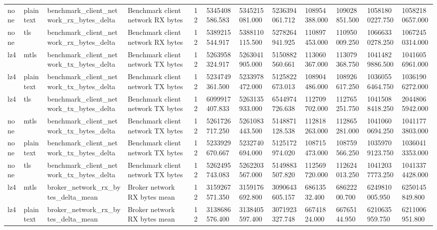 \begin{longtable}{llllllllllll}
none & plaintext & benchmark\_client\_network\_rx\_bytes\_delta & Benchmark client network RX bytes & 12 & 5345408586.583 & 5345215081.000 & 5236394061.712 & 108954388.000 & 109028851.500 & 10581800227.750 & 10582180657.000 \\
none & tls & benchmark\_client\_network\_rx\_bytes\_delta & Benchmark client network RX bytes & 12 & 5389215544.917 & 5388110115.500 & 5278264941.925 & 110897453.000 & 110950009.250 & 10666330278.250 & 10672450314.000 \\
lz4 & mtls & benchmark\_client\_network\_tx\_bytes\_delta & Benchmark client network TX bytes & 12 & 5263958324.917 & 5263041905.000 & 5150882560.661 & 113060367.000 & 113079368.750 & 10414829886.500 & 10416056961.000 \\
lz4 & plaintext & benchmark\_client\_network\_tx\_bytes\_delta & Benchmark client network TX bytes & 12 & 5234749361.500 & 5233978472.000 & 5125822673.013 & 108904486.000 & 108926617.250 & 10360556464.750 & 10361906272.000 \\
lz4 & tls & benchmark\_client\_network\_tx\_bytes\_delta & Benchmark client network TX bytes & 12 & 6099917407.833 & 5263135933.000 & 6544974726.638 & 112709702.000 & 112765251.750 & 10415088418.250 & 20448065942.000 \\
none & mtls & benchmark\_client\_network\_tx\_bytes\_delta & Benchmark client network TX bytes & 12 & 5261726717.250 & 5261083443.500 & 5148871128.538 & 112818263.000 & 112865281.000 & 10410600694.250 & 10411773803.000 \\
none & plaintext & benchmark\_client\_network\_tx\_bytes\_delta & Benchmark client network TX bytes & 12 & 5233929670.667 & 5232740694.000 & 5125172974.020 & 108715473.000 & 108759566.250 & 10359709123.750 & 10360413353.000 \\
none & tls & benchmark\_client\_network\_tx\_bytes\_delta & Benchmark client network TX bytes & 12 & 5262495743.083 & 5262203567.000 & 5149883507.820 & 112569720.000 & 112624013.250 & 10412037773.250 & 10413374428.000 \\
lz4 & mtls & broker\_network\_rx\_bytes\_delta\_mean & Broker network RX bytes mean & 12 & 3159267571.350 & 3159176692.800 & 3090643605.157 & 68613532.400 & 68622200.700 & 6249810005.950 & 6250145849.800 \\
lz4 & plaintext & broker\_network\_rx\_bytes\_delta\_mean & Broker network RX bytes mean & 12 & 3138686576.400 & 3138405597.400 & 3071923327.748 & 66741824.000 & 66765144.950 & 6210635959.750 & 6211006951.800 \\

\end{longtable}
